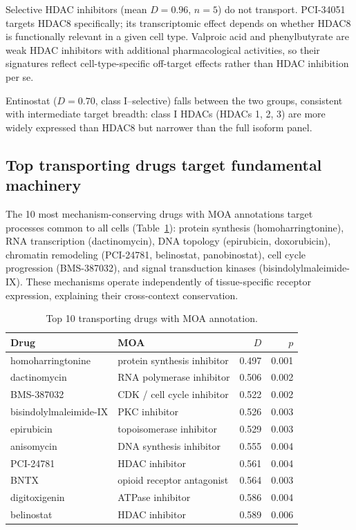 \documentclass{article}
\begin{document}
Selective HDAC inhibitors (mean $D = 0.96$, $n = 5$) do not transport.
PCI-34051 targets HDAC8 specifically; its transcriptomic effect depends on
whether HDAC8 is functionally relevant in a given cell type. Valproic acid
and phenylbutyrate are weak HDAC inhibitors with additional pharmacological
activities, so their signatures reflect cell-type-specific off-target
effects rather than HDAC inhibition per se.

Entinostat ($D = 0.70$, class I--selective) falls between the two groups,
consistent with intermediate target breadth: class I HDACs (HDACs 1, 2, 3)
are more widely expressed than HDAC8 but narrower than the full isoform
panel.

\subsection{Top transporting drugs target fundamental machinery}

The 10 most mechanism-conserving drugs with MOA annotations target processes
common to all cells (Table~\ref{tab:top}): protein synthesis
(homoharringtonine), RNA transcription (dactinomycin), DNA topology
(epirubicin, doxorubicin), chromatin remodeling (PCI-24781, belinostat,
panobinostat), cell cycle progression (BMS-387032), and signal transduction
kinases (bisindolylmaleimide-IX). These mechanisms operate independently
of tissue-specific receptor expression, explaining their cross-context
conservation.

\begin{table}[t]
\centering
\caption{Top 10 transporting drugs with MOA annotation.}
\label{tab:top}
\small
\begin{tabular}{llrr}
\toprule
Drug & MOA & $D$ & $p$ \\
\midrule
homoharringtonine & protein synthesis inhibitor & 0.497 & 0.001 \\
dactinomycin & RNA polymerase inhibitor & 0.506 & 0.002 \\
BMS-387032 & CDK / cell cycle inhibitor & 0.522 & 0.002 \\
bisindolylmaleimide-IX & PKC inhibitor & 0.526 & 0.003 \\
epirubicin & topoisomerase inhibitor & 0.529 & 0.003 \\
anisomycin & DNA synthesis inhibitor & 0.555 & 0.004 \\
PCI-24781 & HDAC inhibitor & 0.561 & 0.004 \\
BNTX & opioid receptor antagonist & 0.564 & 0.003 \\
digitoxigenin & ATPase inhibitor & 0.586 & 0.004 \\
belinostat & HDAC inhibitor & 0.589 & 0.006 \\
\bottomrule
\end{tabular}
\end{table}
\end{document}
